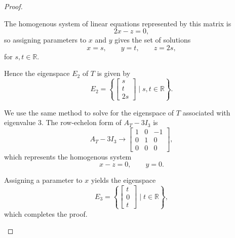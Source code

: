 \begin{enumerate}
\begin{enumerate}
\begin{proof}
\begin{subproof}
                        \smallskip

                        The homogenous system of linear equations represented by this matrix is
                        \[ 2 x - z = 0, \]
                        so assigning parameters to $x$ and $y$ gives the set of solutions
                        \[ x = s, \qquad y = t, \qquad z = 2 s, \]
                        for $s, t \in \mathbb{R}$.

                        Hence the eigenspace $E_2$ of $T$ is given by
                        \[
                            E_2 = \left\{
                                \begin{bmatrix}
                                    s \\ t \\ 2 s
                                \end{bmatrix}
                                \; \Big| \; s, t \in \mathbb{R}
                            \right\}.
                        \]

                        We use the same method to solve for the eigenspace of $T$ associated with eigenvalue $3$.
                        The row-echelon form of $A_T - 3 I_3$ is
                        \[
                            A_T - 3 I_3 \longrightarrow
                            \begin{bmatrix}
                                1 & 0 & -1 \\
                                0 & 1 & 0 \\
                                0 & 0 & 0
                            \end{bmatrix},
                        \]
                        which represents the homogenous system
                        \[ x - z = 0, \qquad y = 0. \]

                        Assigning a parameter to $x$ yields the eigenspace
                        \[
                            E_3 = \left\{
                                \begin{bmatrix}
                                    t \\ 0 \\ t
                                \end{bmatrix}
                                \; \Big| \; t \in \mathbb{R}
                            \right\},
                        \]
                        which completes the proof.
                    \end{subproof}


\end{proof}
\end{enumerate}
\end{enumerate}
